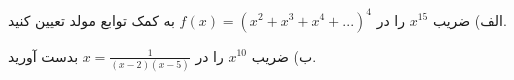 \EXERCISE
الف) ضریب
$x^{15}$
را در
$f(x) = (x^{2} + x^{3} + x^{4} + ...)^4$
به کمک توابع مولد تعیین کنید.

ب) ضریب
$x^{10}$
را در
$x = \frac{1}{(x-2)(x-5)}$
بدست آورید.